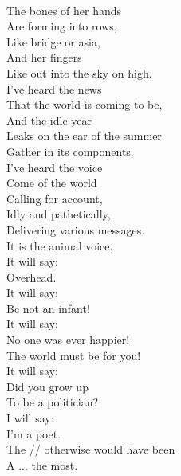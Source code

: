 \documentclass[smalldemyvopaper,11pt,twoside,onecolumn,openright,extrafontsizes]{memoir}
\begin{document}
\\The bones of her hands
\\Are forming into rows,
\\Like bridge or asia,
\\And her fingers
\\Like out into the sky on high.
\\I've heard the news
\\That the world is coming to be,
\\And the idle year
\\Leaks on the ear of the summer
\\Gather in its components.
\\I've heard the voice
\\Come of the world
\\Calling for account,
\\Idly and pathetically,
\\Delivering various messages.
\\It is the animal voice.
\\It will say:
\\Overhead.
\\It will say:
\\Be not an infant!
\\It will say:
\\No one was ever happier!
\\The world must be for you!
\\It will say:
\\Did you grow up
\\To be a politician?
\\I will say:
\\I'm a poet.
\\The // otherwise would have been
\\A ... the most.
\end{document}
